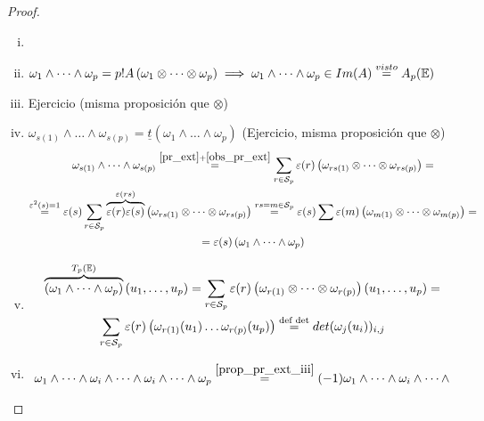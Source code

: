 \begin{proof}
    \begin{enumerate}[i)]
        \item[]
        \item $\omega_1 \wedge \dots \wedge \omega_p = p! A\left(\omega_1 \otimes \dots \otimes \omega_p 
        \right) \implies \omega_1 \wedge \dots \wedge \omega_p \in Im(A) \stackrel{visto}{=} A_p(\mathbb{E})$
        \item Ejercicio (misma proposición que $\otimes$)
        \item $\omega_{s(1)} \wedge \dots \wedge \omega_{s(p)} = \underline{t}(\omega_1 \wedge \dots \wedge 
        \omega_p)$ (Ejercicio, misma proposición que $\otimes$)
        \begin{gather*}
            \omega_{s(1)} \wedge \dots \wedge \omega_{s(p)} \stackrel{\ref{pr_ext} + \ref{obs_pr_ext}}{=}
            \sum_{r \in \mathcal{S}_p} \varepsilon(r) \left( \omega_{rs(1)} \otimes \dots \otimes 
            \omega_{rs(p)} \right) = \\ 
            \stackrel{\varepsilon^2(s)=1}{=} \varepsilon(s) \sum_{r \in \mathcal{S}_p} \overbrace{\varepsilon(r)
            \varepsilon(s)}^{\varepsilon(rs)} \left( \omega_{rs(1)} \otimes \dots \otimes\omega_{rs(p)}
            \right) \stackrel{rs = m \in \mathcal{S}_p}{=} \varepsilon(s) \sum \varepsilon(m)
            \left( \omega_{m(1)} \otimes \dots \otimes \omega_{m(p)} \right) = \\
            = \varepsilon(s) \left( \omega_1 \wedge \dots \wedge \omega_p \right)
        \end{gather*}
        \item 
        \begin{gather*}
        \overbrace{\left( \omega_1 \wedge \dots \wedge \omega_p \right)}^{T_p(\mathbb{E})} \left(u_1,\dots,u_p
        \right) = \sum_{r\in\mathcal{S}_p} \varepsilon(r) \left( \omega_{r(1)} \otimes \dots \otimes 
        \omega_{r(p)} \right) \left( u_1,\dots,u_p \right) = \\
        \sum_{r \in \mathcal{S}_p} \varepsilon(r) \left( \omega_{r(1)}(u_1) \dots \omega_{r(p)}(u_p) \right)
        \stackrel{\text{def det}}{=} det(\omega_j(u_i))_{i,j}
        \end{gather*}
        \item
        \begin{gather*}
        \omega_1 \wedge \dots \wedge \omega_i \wedge \dots \wedge \omega_i \wedge \dots \wedge \omega_p
        \stackrel{\ref{prop_pr_ext_iii}}{=} (-1) \omega_1 \wedge \dots \wedge \omega_i \wedge \dots \wedge

\end{gather*}
\end{enumerate}
\end{proof}
